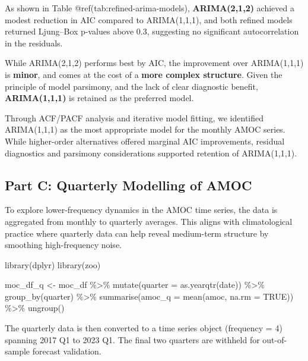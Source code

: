 \documentclass[
  11pt,
]{article}
\newenvironment{Shaded}{\begin{snugshade}}{\end{snugshade}}
\newcommand{\AttributeTok}[1]{\textcolor[rgb]{0.40,0.45,0.13}{#1}}
\newcommand{\ConstantTok}[1]{\textcolor[rgb]{0.56,0.35,0.01}{#1}}
\newcommand{\FunctionTok}[1]{\textcolor[rgb]{0.28,0.35,0.67}{#1}}
\newcommand{\NormalTok}[1]{\textcolor[rgb]{0.00,0.23,0.31}{#1}}
\newcommand{\OtherTok}[1]{\textcolor[rgb]{0.00,0.23,0.31}{#1}}
\newcommand{\SpecialCharTok}[1]{\textcolor[rgb]{0.37,0.37,0.37}{#1}}
\begin{document}
As shown in Table @ref(tab:refined-arima-models), \textbf{ARIMA(2,1,2)}
achieved a modest reduction in AIC compared to ARIMA(1,1,1), and both
refined models returned Ljung--Box p-values above 0.3, suggesting no
significant autocorrelation in the residuals.

While ARIMA(2,1,2) performs best by AIC, the improvement over
ARIMA(1,1,1) is \textbf{minor}, and comes at the cost of a \textbf{more
complex structure}. Given the principle of model parsimony, and the lack
of clear diagnostic benefit, \textbf{ARIMA(1,1,1)} is retained as the
preferred model.

Through ACF/PACF analysis and iterative model fitting, we identified
ARIMA(1,1,1) as the most appropriate model for the monthly AMOC series.
While higher-order alternatives offered marginal AIC improvements,
residual diagnostics and parsimony considerations supported retention of
ARIMA(1,1,1).

\subsection{Part C: Quarterly Modelling of
AMOC}\label{part-c-quarterly-modelling-of-amoc}

To explore lower-frequency dynamics in the AMOC time series, the data is
aggregated from monthly to quarterly averages. This aligns with
climatological practice where quarterly data can help reveal medium-term
structure by smoothing high-frequency noise.

\begin{Shaded}
\begin{Highlighting}[]
\FunctionTok{library}\NormalTok{(dplyr)}
\FunctionTok{library}\NormalTok{(zoo)}

\NormalTok{moc\_df\_q }\OtherTok{\textless{}{-}}\NormalTok{ moc\_df }\SpecialCharTok{\%\textgreater{}\%}
  \FunctionTok{mutate}\NormalTok{(}\AttributeTok{quarter =} \FunctionTok{as.yearqtr}\NormalTok{(date)) }\SpecialCharTok{\%\textgreater{}\%}
  \FunctionTok{group\_by}\NormalTok{(quarter) }\SpecialCharTok{\%\textgreater{}\%}
  \FunctionTok{summarise}\NormalTok{(}\AttributeTok{amoc\_q =} \FunctionTok{mean}\NormalTok{(amoc, }\AttributeTok{na.rm =} \ConstantTok{TRUE}\NormalTok{)) }\SpecialCharTok{\%\textgreater{}\%}
  \FunctionTok{ungroup}\NormalTok{()}
\end{Highlighting}
\end{Shaded}

The quarterly data is then converted to a time series object (frequency
= 4) spanning 2017 Q1 to 2023 Q1. The final two quarters are withheld
for out-of-sample forecast validation.
\end{document}
